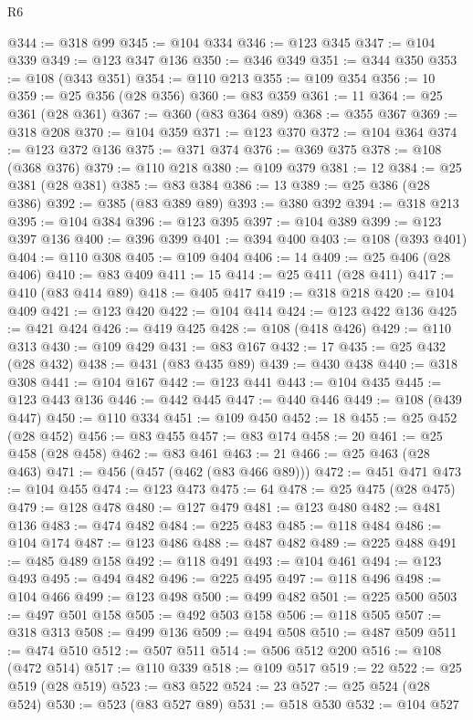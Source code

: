 \begin{lexlean}{R6}
\begin{coremodule}
@344 := @318 @99
@345 := @104 @334
@346 := @123 @345
@347 := @104 @339
@349 := @123 @347 @136
@350 := @346 @349
@351 := @344 @350
@353 := @108 (@343 @351)
@354 := @110 @213
@355 := @109 @354
@356 := 10
@359 := @25 @356 (@28 @356)
@360 := @83 @359
@361 := 11
@364 := @25 @361 (@28 @361)
@367 := @360 (@83 @364 @89)
@368 := @355 @367
@369 := @318 @208
@370 := @104 @359
@371 := @123 @370
@372 := @104 @364
@374 := @123 @372 @136
@375 := @371 @374
@376 := @369 @375
@378 := @108 (@368 @376)
@379 := @110 @218
@380 := @109 @379
@381 := 12
@384 := @25 @381 (@28 @381)
@385 := @83 @384
@386 := 13
@389 := @25 @386 (@28 @386)
@392 := @385 (@83 @389 @89)
@393 := @380 @392
@394 := @318 @213
@395 := @104 @384
@396 := @123 @395
@397 := @104 @389
@399 := @123 @397 @136
@400 := @396 @399
@401 := @394 @400
@403 := @108 (@393 @401)
@404 := @110 @308
@405 := @109 @404
@406 := 14
@409 := @25 @406 (@28 @406)
@410 := @83 @409
@411 := 15
@414 := @25 @411 (@28 @411)
@417 := @410 (@83 @414 @89)
@418 := @405 @417
@419 := @318 @218
@420 := @104 @409
@421 := @123 @420
@422 := @104 @414
@424 := @123 @422 @136
@425 := @421 @424
@426 := @419 @425
@428 := @108 (@418 @426)
@429 := @110 @313
@430 := @109 @429
@431 := @83 @167
@432 := 17
@435 := @25 @432 (@28 @432)
@438 := @431 (@83 @435 @89)
@439 := @430 @438
@440 := @318 @308
@441 := @104 @167
@442 := @123 @441
@443 := @104 @435
@445 := @123 @443 @136
@446 := @442 @445
@447 := @440 @446
@449 := @108 (@439 @447)
@450 := @110 @334
@451 := @109 @450
@452 := 18
@455 := @25 @452 (@28 @452)
@456 := @83 @455
@457 := @83 @174
@458 := 20
@461 := @25 @458 (@28 @458)
@462 := @83 @461
@463 := 21
@466 := @25 @463 (@28 @463)
@471 := @456 (@457 (@462 (@83 @466 @89)))
@472 := @451 @471
@473 := @104 @455
@474 := @123 @473
@475 := 64
@478 := @25 @475 (@28 @475)
@479 := @128 @478
@480 := @127 @479
@481 := @123 @480
@482 := @481 @136
@483 := @474 @482
@484 := @225 @483
@485 := @118 @484
@486 := @104 @174
@487 := @123 @486
@488 := @487 @482
@489 := @225 @488
@491 := @485 @489 @158
@492 := @118 @491
@493 := @104 @461
@494 := @123 @493
@495 := @494 @482
@496 := @225 @495
@497 := @118 @496
@498 := @104 @466
@499 := @123 @498
@500 := @499 @482
@501 := @225 @500
@503 := @497 @501 @158
@505 := @492 @503 @158
@506 := @118 @505
@507 := @318 @313
@508 := @499 @136
@509 := @494 @508
@510 := @487 @509
@511 := @474 @510
@512 := @507 @511
@514 := @506 @512 @200
@516 := @108 (@472 @514)
@517 := @110 @339
@518 := @109 @517
@519 := 22
@522 := @25 @519 (@28 @519)
@523 := @83 @522
@524 := 23
@527 := @25 @524 (@28 @524)
@530 := @523 (@83 @527 @89)
@531 := @518 @530
@532 := @104 @527

\end{coremodule}
\end{lexlean}
